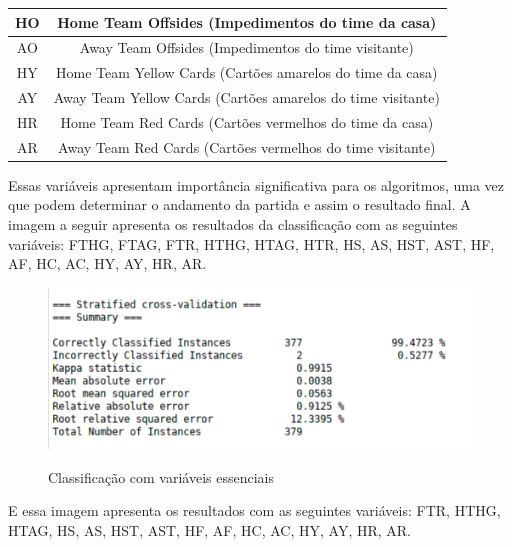 \begin{table}[]
\begin{tabular}{@{}|c|c|@{}}
		HO   & Home Team Offsides (Impedimentos do time da casa)                         \\ \midrule
		AO   & Away Team Offsides (Impedimentos do time visitante)                       \\ \midrule
		HY   & Home Team Yellow Cards (Cartões amarelos do time da casa)                 \\ \midrule
		AY   & Away Team Yellow Cards (Cartões amarelos do time visitante)               \\ \midrule
		HR   & Home Team Red Cards (Cartões vermelhos do time da casa)                   \\ \midrule
		AR   & Away Team Red Cards (Cartões vermelhos do time visitante)                 \\ \bottomrule
	\end{tabular}
\end{table}

\newpage
Essas variáveis apresentam importância significativa para os algoritmos, uma vez que podem determinar o andamento da partida e assim o resultado final.
A imagem a seguir apresenta os resultados da classificação com as seguintes variáveis: FTHG, FTAG, FTR, HTHG, HTAG, HTR, HS, AS, HST, AST, HF, AF, HC, AC, HY, AY, HR, AR.

\begin{figure}[htbp]
	\begin{center}
		\includegraphics[width=.9\linewidth]{imagens/dados_completos.png}\\
	\end{center}
	\caption[Classificação com variáveis essenciais]{Classificação com variáveis essenciais}
	\label{fig:logo}
\end{figure}

E essa imagem apresenta os resultados com as seguintes variáveis: FTR, HTHG, HTAG, HS, AS, HST, AST, HF, AF, HC, AC, HY, AY, HR, AR.

\newpage

